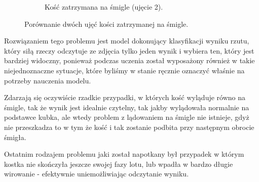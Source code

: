 \begin{figure}[H]
\begin{subfigure}[t]{0.45\linewidth}
        \caption{Kość zatrzymana na śmigle (ujęcie 2).}
        \label{fig:smiglo}
    \end{subfigure}
    \caption{Porównanie dwóch ujęć kości zatrzymanej na śmigle.}
    \label{fig:smiglocombined}
\end{figure}


Rozwiązaniem tego problemu jest model dokonujący klasyfikacji wyniku rzutu, który siłą rzeczy odczytuje ze zdjęcia tylko jeden wynik i wybiera ten,
który jest bardziej widoczny, ponieważ podczas uczenia został wyposażony również w takie niejednoznaczne sytuacje,
które byliśmy w stanie ręcznie oznaczyć właśnie na potrzeby nauczenia modelu.

Zdarzają się oczywiście rzadkie przypadki, w których kość wyląduje równo na śmigle, tak że wynik jest idealnie czytelny,
tak jakby wylądowała normalnie na podstawce kubka, ale wtedy problem z lądowaniem na śmigle nie istnieje,
gdyż nie przeszkadza to w tym że kość i tak zostanie podbita przy następnym obrocie śmigła.


Ostatnim rodzajem problemu jaki został napotkany był przypadek w którym kostka nie skończyła jeszcze swojej fazy lotu,
lub wpadła w bardzo długie wirowanie - efektywnie uniemożliwiając odczytanie wyniku.

